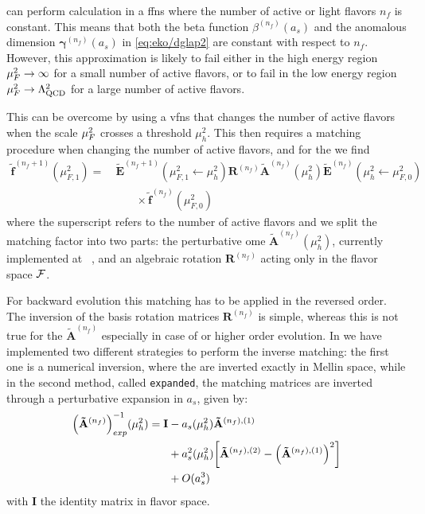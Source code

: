 \eko{} can perform calculation in a \acrfull{ffns} where the number of active
or light flavors $n_f$ is constant. 
This means that both the beta function $\beta^{(n_f)}(a_s)$ and the anomalous
dimension $\bm{\gamma}^{(n_f)}(a_s)$ in \cref{eq:eko/dglap2} are constant with
respect to $n_f$.
However, this approximation is likely to fail either in the high energy region
$\mu_F^2 \to \infty$ for a small number of active flavors, or to fail in the low
energy region $\mu_F^2 \to \Lambda_{\text{QCD}}^2$ for a large number of active
flavors.

This can be overcome by using a \acrfull{vfns} that changes the number of
active flavors when the scale $\mu_F^2$ crosses a threshold $\mu_h^2$.
This then requires a matching procedure when changing the number of active
flavors, and for the \pdfs we find
\begin{align}
  \tilde{\mathbf{f}}^{(n_f+1)}(\mu_{F,1}^2)=&~ \tilde{\mathbf{E}}^{(n_f+1)}(\mu_{F,1}^2\leftarrow \mu_{h}^2) {\mathbf{R}^{(n_f)}} 
  \tilde{\mathbf{A}}^{(n_f)}(\mu_{h}^2) \tilde{\mathbf{E}}^{(n_f)}(\mu_{h}^2\leftarrow \mu_{F,0}^2)\nonumber\\
  &\qquad \times\tilde{\mathbf{f}}^{(n_f)}(\mu_{F,0}^2)
  \label{eq:eko/matching}
\end{align}
where the superscript refers to the number of active flavors and we split the
matching factor into two parts: the perturbative \acrfull{ome}
$\tilde{\mathbf{A}}^{(n_f)}(\mu_{h}^2)$, currently implemented at
\nnlo{}~\cite{Buza_1998}, and an algebraic rotation ${\mathbf{R}^{(n_f)}}$
acting only in the flavor space $\mathcal{F}$.

For backward evolution this matching has to be applied in the reversed order.
The inversion of the basis rotation matrices $\mathbf{R}^{(n_f)}$ is simple,
whereas this is not true for the \ome $\mathbf{\tilde A}^{(n_f)}$ especially
in case of \nnlo{} or higher order evolution.
In \eko{} we have implemented two different strategies to perform the inverse
matching: the first one is a numerical inversion, where the 
are inverted exactly in Mellin space, while in the second method, called
\texttt{expanded},
the matching matrices are inverted through a perturbative expansion in $a_s$,
given by:
\begin{align}
  \qty(\mathbf{\tilde A}^{(n_f)})_{exp}^{-1}(\mu_{h}^2) = \mathbf{I}
  &- a_s(\mu_{h}^2) \mathbf{\tilde A}^{(n_f),(1)} \nonumber\\
  &+ a_s^2(\mu_{h}^2) \qty[ \mathbf{\tilde A}^{(n_f),(2)} - \qty(\mathbf{\tilde A}^{(n_f),(1)})^2 ] \nonumber\\
  &+ O(a_s^3)
  \label{eq:eko/invmatchingexp}
\end{align}
with $\mathbf{I}$ the identity matrix in flavor space.
